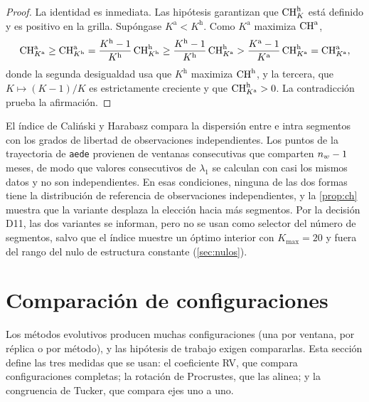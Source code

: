 \begin{proof}
La identidad es inmediata. Las hipótesis garantizan que $\operatorname{CH}^{\mathrm h}_K$ está definido y es
positivo en la grilla. Supóngase $K^{\mathrm a}<K^{\mathrm h}$. Como $K^{\mathrm a}$ maximiza
$\operatorname{CH}^{\mathrm a}$,
\[
  \operatorname{CH}^{\mathrm a}_{K^{\mathrm a}}\ge\operatorname{CH}^{\mathrm a}_{K^{\mathrm h}}
  =\frac{K^{\mathrm h}-1}{K^{\mathrm h}}\operatorname{CH}^{\mathrm h}_{K^{\mathrm h}}
  \ge\frac{K^{\mathrm h}-1}{K^{\mathrm h}}\operatorname{CH}^{\mathrm h}_{K^{\mathrm a}}
  >\frac{K^{\mathrm a}-1}{K^{\mathrm a}}\operatorname{CH}^{\mathrm h}_{K^{\mathrm a}}
  =\operatorname{CH}^{\mathrm a}_{K^{\mathrm a}},
\]
donde la segunda desigualdad usa que $K^{\mathrm h}$ maximiza $\operatorname{CH}^{\mathrm h}$, y la tercera, que
$K\mapsto(K-1)/K$ es estrictamente creciente y que $\operatorname{CH}^{\mathrm h}_{K^{\mathrm a}}>0$. La
contradicción prueba la afirmación.
\end{proof}

\begin{observacion}\label{obs:ch}
El índice de Caliński y Harabasz compara la dispersión entre e intra segmentos con los grados de
libertad de observaciones independientes. Los puntos de la trayectoria de \texttt{aede}
provienen de ventanas consecutivas que comparten $n_{w}-1$ meses, de modo que valores consecutivos
de $\lambda_1$ se calculan con casi los mismos datos y no son independientes. En esas
condiciones, ninguna de las dos formas tiene la distribución de referencia de observaciones
independientes, y la \cref{prop:ch} muestra que la variante desplaza la elección hacia más
segmentos. Por la decisión D11, las dos variantes se informan, pero no se usan como selector del
número de segmentos, salvo que el índice muestre un óptimo interior con $K_{\max}=20$ y fuera del
rango del nulo de estructura constante (\cref{sec:nulos}).
\end{observacion}

\section{Comparación de configuraciones}
\label{sec:comparacion}

Los métodos evolutivos producen muchas configuraciones (una por ventana, por réplica o por
método), y las hipótesis de trabajo exigen compararlas. Esta sección define las tres medidas que
se usan: el coeficiente RV, que compara configuraciones completas; la rotación de Procrustes, que
las alinea; y la congruencia de Tucker, que compara ejes uno a uno.

